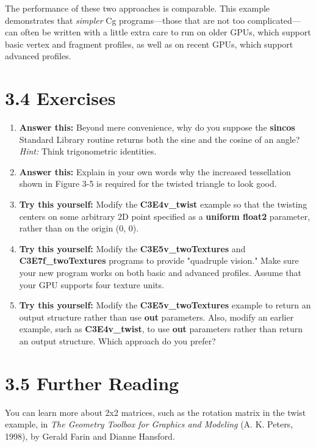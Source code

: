\documentclass[../main.tex]{subfiles}
\begin{document}
The performance of these two approaches is comparable. This example demonstrates that \textit{simpler} Cg programs—those that are not too complicated—can often be written with a little extra care to run on older GPUs, which support basic vertex and fragment profiles, as well as on recent GPUs, which support advanced profiles.

\section{3.4 Exercises}

\begin{enumerate}
\item \textbf{Answer this:} Beyond mere convenience, why do you suppose the \textbf{sincos} Standard Library routine returns both the sine and the cosine of an angle? \textit{Hint:} Think trigonometric identities.
\item \textbf{Answer this:} Explain in your own words why the increased tessellation shown in Figure 3-5 is required for the twisted triangle to look good.
\item \textbf{Try this yourself:} Modify the \textbf{C3E4v_twist} example so that the twisting centers on some arbitrary 2D point specified as a \textbf{uniform float2} parameter, rather than on the origin (0, 0).
\item \textbf{Try this yourself:} Modify the \textbf{C3E5v_twoTextures} and \textbf{C3E7f_twoTextures} programs to provide "quadruple vision." Make sure your new program works on both basic and advanced profiles. Assume that your GPU supports four texture units.
\item \textbf{Try this yourself:} Modify the \textbf{C3E5v_twoTextures} example to return an output structure rather than use \textbf{out} parameters. Also, modify an earlier example, such as \textbf{C3E4v_twist}, to use \textbf{out} parameters rather than return an output structure. Which approach do you prefer?
\end{enumerate}

\section{3.5 Further Reading}

You can learn more about 2x2 matrices, such as the rotation matrix in the twist example, in \textit{The Geometry Toolbox for Graphics and Modeling} (A. K. Peters, 1998), by Gerald Farin and Dianne Hansford.
\end{document}
